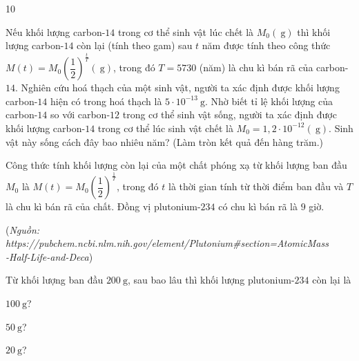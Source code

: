 \begin{indapan}{10}
\begin{vd} 
	Nếu khối lượng carbon-$14$ trong cơ thể sinh vật lúc chết là $M_0(\mathrm{~g})$ thì khối lượng carbon-$14$ còn lại (tính theo gam) sau $t$ năm được tính theo công thức $M(t)=M_0\left(\dfrac{1}{2}\right)^{\tfrac{t}{T}}(\mathrm{~g})$, trong đó $T=5730$ (năm) là chu kì bán rã của carbon-$14$. Nghiên cứu hoá thạch của một sinh vật, người ta xác định được khối lượng carbon-$14$ hiện có trong hoá thạch là $5 \cdot 10^{-13} \mathrm{~g}$. Nhờ biết tỉ lệ khối lượng của carbon-$14$ so với carbon-$12$ trong cơ thể sinh vật sống, người ta xác định được khối lượng carbon-$14$ trong cơ thể lúc sinh vật chết là $M_0=1{,}2\cdot 10^{-12}(\mathrm{~g})$. Sinh vật này sống cách đây bao nhiêu năm? (Làm tròn kết quả đến hàng trăm.)
\end{vd}

\begin{vd} 
	Công thức tính khối lượng còn lại của một chất phóng xạ từ khối lượng ban đầu $M_0$ là $M(t)=M_0\left(\dfrac{1}{2}\right)^{\tfrac{1}{T}}$, trong đó $t$ là thời gian tính từ thời điểm ban đầu và $T$ là chu kì bán rã của chất. Đồng vị plutonium-$234$ có chu kì bán rã là $9$ giờ.
	\begin{flushright}
		(\textit{Nguồn: https://pubchem.ncbi.nlm.nih.gov/element/Plutonium\#section=AtomicMass\\-Half-Life-and-Deca})
	\end{flushright}
	Từ khối lượng ban đầu $200 \mathrm{~g}$, sau bao lâu thì khối lượng plutonium-$234$ còn lại là
	\begin{listEX}[3]
		\item $100 \mathrm{~g}$?
		\item $50 \mathrm{~g}$?
		\item $20 \mathrm{~g}$?
	\end{listEX}
\end{vd}


\end{indapan}
